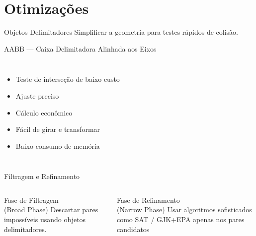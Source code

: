\documentclass[12pt]{beamer}
\begin{document}
\section{Otimizações}

\begin{frame}{Objetos Delimitadores}
  Simplificar a geometria para testes rápidos de colisão.\\
  
  \begin{figure}
    \centering
    
  \end{figure}
\end{frame}

\begin{frame}{AABB — Caixa Delimitadora Alinhada aos Eixos}
  \begin{columns}[c]
      \begin{itemize}
        \item Teste de interseção de baixo custo
        \item Ajuste preciso
        \item Cálculo econômico
        \item Fácil de girar e transformar
        \item Baixo consumo de memória
      \end{itemize}
      \begin{figure}
        \centering
        
      \end{figure}
    \end{columns}
\end{frame}

\begin{frame}{Filtragem e Refinamento}
  \begin{columns}[c]
      \begin{block}{\centering Fase de Filtragem\\ (Broad Phase)}
        \centering Descartar pares impossíveis usando objetos delimitadores.
      \end{block}
      \begin{block}{\centering Fase de Refinamento\\ (Narrow Phase)}
        \centering Usar algoritmos sofisticados como SAT / GJK+EPA apenas nos pares candidatos
      \end{block}
  \end{columns}
\end{frame}
\end{document}
